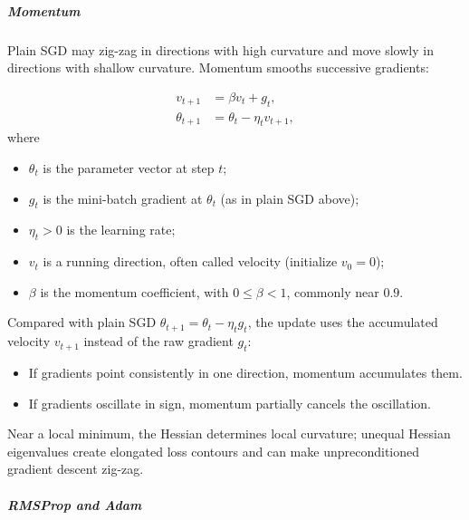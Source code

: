 \documentclass[11pt,a4paper]{article}
\theoremstyle{definition}
\begin{document}
\subparagraph{Momentum}

Plain SGD may zig-zag in directions with high curvature and move slowly in directions with shallow curvature. Momentum smooths successive gradients:

\begin{align*}
v_{t+1} &= \beta v_t + g_t, \\
\theta_{t+1} &= \theta_t - \eta_t v_{t+1},
\end{align*}
where
\begin{itemize}
  \item $\theta_t$ is the parameter vector at step $t$;
  \item $g_t$ is the mini-batch gradient at $\theta_t$ (as in plain SGD above);
  \item $\eta_t>0$ is the learning rate;
  \item $v_t$ is a running direction, often called velocity (initialize $v_0=0$);
  \item $\beta$ is the momentum coefficient, with $0\leq\beta<1$, commonly near $0.9$.
\end{itemize}

Compared with plain SGD $\theta_{t+1}=\theta_t-\eta_t g_t$, the update uses the accumulated velocity $v_{t+1}$ instead of the raw gradient $g_t$:
\begin{itemize}
    \item If gradients point consistently in one direction, momentum accumulates them.
    \item If gradients oscillate in sign, momentum partially cancels the oscillation.
\end{itemize}

Near a local minimum, the Hessian determines local curvature; unequal Hessian eigenvalues create elongated loss contours and can make unpreconditioned gradient descent zig-zag.

\subparagraph{RMSProp and Adam}
\end{document}
